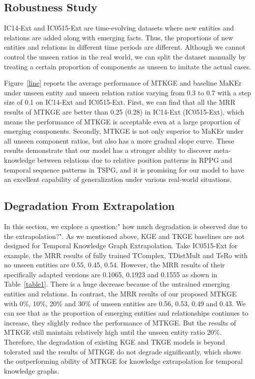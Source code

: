 \documentclass[sigconf]{acmart}
\begin{document}
\subsection{Robustness Study} 
\label{Robustness Study}
\par
IC14-Ext and IC0515-Ext are time-evolving datasets where new entities and relations are added along with emerging facts. Thus, the proportions of new entities and relations in different time periods are different.
Although we cannot control the unseen ratios in the real world, we can split the dataset manually by treating a certain proportion of components as unseen to imitate the actual cases.
\par
Figure~\ref{line} reports the average performance  of  MTKGE and baseline MaKEr  under unseen entity and unseen relation ratios varying from 0.3 to 0.7 with a step size of 0.1 on IC14-Ext and IC0515-Ext. 
First, we can find that all the MRR results of MTKGE are better than 0.25 (0.28) in IC14-Ext (IC0515-Ext), which means the performance of MTKGE is acceptable even at a large proportion of emerging components. 
Secondly, MTKGE is not only superior to MaKEr under all unseen component ratios, but also has a more gradual slope curve. These results demonstrate that our model has a stronger ability to discover meta-knowledge between relations due to  relative position patterns in RPPG and temporal sequence patterns in TSPG, and it is promising for our model to have
an excellent capability of generalization under various real-world situations. 

\subsection{Degradation From Extrapolation}
In this section, we explore a question:" how much degradation is observed due to the extrapolation?".
As we mentioned above, KGE and TKGE baselines are not designed for Temporal Knowledge Graph Extrapolation. 
Take IC0515-Ext for example, the MRR results of fully trained TComplex, TDistMult and TeRo with no unseen entities are 0.55, 0.45, 0.54. However, the MRR results of their specifically adapted versions are 0.1065, 0.1923 and 0.1555 as shown in Table~\ref{table1}. There is a huge decrease because of the untrained emerging entities and relations.
In contrast, the MRR results of our proposed MTKGE with 0\%, 10\%, 20\% and 30\% of unseen entities are 0.56, 0.53, 0.49 and 0.43. We can see that as the proportion of emerging entities and relationships continues to increase, they slightly reduce the performance of MTKGE. But the results of MTKGE still maintain relatively high until the unseen entity ratio 20\%.
Therefore, the degradation of existing KGE and TKGE models is beyond tolerated and the results of MTKGE do not degrade significantly, which shows the outperforming ability of MTKGE for knowledge extrapolation for temporal knowledge graphs.
\end{document}
